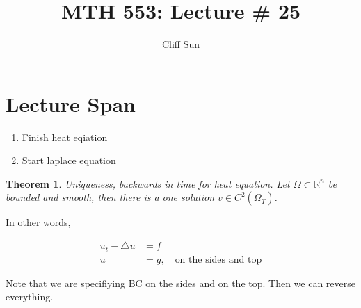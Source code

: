 \documentclass{article}
\title{MTH 553: Lecture \# 25}
\author{Cliff Sun}
\newtheorem{theorem}{Theorem}[section]
\newtheorem{one minute paper}[theorem]{One Minute Paper}
\begin{document}
\maketitle

\section*{Lecture Span}
\begin{enumerate}
    \item Finish heat eqiation
    \item Start laplace equation
\end{enumerate}

\begin{theorem}
    Uniqueness, backwards in time for heat equation. Let $\Omega \subset \mathbb{R}^n$ be bounded and smooth, then there is a one solution $v \in C^{2}(\overline{\Omega}_T)$.
\end{theorem}

In other words, 

\begin{align*}
    u_t - \triangle u &= f\\
    u &= g, \quad \text{on the sides and top}
\end{align*}

Note that we are specifiying BC on the sides and on the top. Then we can reverse everything. 
\end{document}

